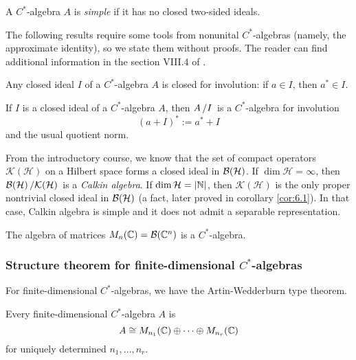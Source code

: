 \begin{definition}
  A $C^*$-algebra $A$ is \emph{simple} if it has no closed two-sided ideals.
\end{definition}

The following results require some tools from nonunital $C^*$-algebras (namely, the approximate identity),
so we state them without proofs. The reader can find additional information in the section VIII.4 of \cite{conway}.

\begin{lemma}
  Any closed ideal $I$ of a $C^*$-algebra $A$ is closed for involution: 
  if $a \in I$, then $a^* \in I$.
\end{lemma}

\begin{proposition}
  If $I$ is a closed ideal of a $C^*$-algebra $A$, then $\quot{A}{I}$
  is a $C^*$-algebra for involution 
  $$(a + I)^* := a^* + I$$
  and the usual quotient norm.
\end{proposition}

\begin{example}\label{ex:3.1}
  From the introductory course, we know that the set of compact operators $\mathcal{K}(\mathcal{H})$ on a Hilbert space forms a closed ideal
  in $\operatorname{\mathcal{B} (\mathcal{H})}$. If $\dim \mathcal{H} = \infty$, then $\quot{\bh}{\mathcal{K}(\mathcal{H})}$ is a \emph{Calkin algebra}.
  If $\dim \mathcal{H} = |\mathbb {N}|$, then $\mathcal{K}(\mathcal{H})$ is the only proper nontrivial closed ideal in $\operatorname{\mathcal{B} (\mathcal{H})}$
  (a fact, later proved in corollary \ref{cor:6.1}). In that case, 
  Calkin algebra is simple and it does not admit a separable representation.
\end{example}

\begin{example}
  The algebra of matrices $M_n (\mathbb {C}) = \mathcal{B}(\mathbb {C}^n)$ is a $C^*$-algebra.
\end{example}

\subsubsection{Structure theorem for finite-dimensional $C^*$-algebras}

For finite-dimensional $C^*$-algebras, we have the Artin-Wedderburn type theorem.

\begin{proposition}
  Every finite-dimensional $C^*$-algebra $A$ is 
  $$ A \cong M_{n_1} (\mathbb {C}) \oplus \dots \oplus M_{n_r} (\mathbb {C})$$
  for uniquely determined $n_1, \dots, n_r$.
\end{proposition}

